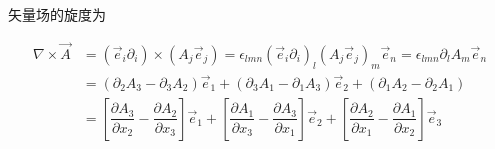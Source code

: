 矢量场的旋度为

\begin{equation*}
  \begin{aligned}
    \nabla \times \vec{A} &= \left( \vec{e}_i \partial_i \right) \times \left( A_j \vec{e}_j \right) = \epsilon_{lmn} \left( \vec{e}_i \partial_i \right)_l \left( A_j \vec{e}_j \right)_m \vec{e}_n = \epsilon_{lmn} \partial_l A_m \vec{e}_n \\
    &= \left( \partial_2 A_3 - \partial_3 A_2 \right) \vec{e}_1 + \left( \partial_3 A_1 - \partial_1 A_3 \right) \vec{e}_2 + \left( \partial_1 A_2 - \partial_2 A_1 \right) \\
    &= \left[ \dfrac{\partial A_3}{\partial x_2} - \dfrac{\partial A_2}{\partial x_3}   \right] \vec{e}_1 + \left[ \dfrac{\partial A_1}{\partial x_3} - \dfrac{\partial A_3}{\partial x_1}   \right] \vec{e}_2 + \left[ \dfrac{\partial A_2}{\partial x_1} - \dfrac{\partial A_1}{\partial x_2}   \right] \vec{e}_3
  \end{aligned}
\end{equation*}

